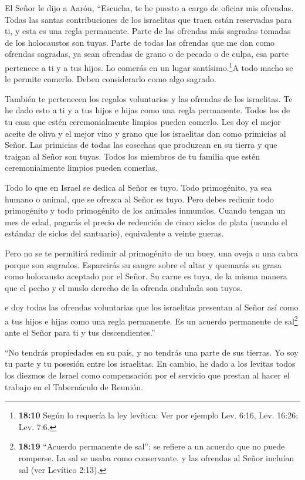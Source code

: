  El Señor le dijo a Aarón, ``Escucha, te he puesto a cargo
de oficiar mis ofrendas. Todas las santas contribuciones de los
israelitas que traen están reservadas para ti, y esta es una regla
permanente.  Parte de las ofrendas más sagradas tomadas de
los holocaustos son tuyas. Parte de todas las ofrendas que me dan como
ofrendas sagradas, ya sean ofrendas de grano o de pecado o de culpa, esa
parte pertenece a ti y a tus hijos.  Lo comerás en un lugar
santísimo.\footnote{\textbf{18:10} Según lo requería la ley levítica:
  Ver por ejemplo Lev. 6:16, Lev. 16:26; Lev. 7:6.}A todo macho se le
permite comerlo. Deben considerarlo como algo sagrado.

 También te pertenecen los regalos voluntarios y las
ofrendas de los israelitas. Te he dado esto a ti y a tus hijos e hijas
como una regla permanente. Todos los de tu casa que estén
ceremonialmente limpios pueden comerlo.  Les doy el mejor
aceite de oliva y el mejor vino y grano que los israelitas dan como
primicias al Señor.  Las primicias de todas las cosechas
que produzcan en su tierra y que traigan al Señor son tuyas. Todos los
miembros de tu familia que estén ceremonialmente limpios pueden
comerlas.

 Todo lo que en Israel se dedica al Señor es tuyo.
 Todo primogénito, ya sea humano o animal, que se ofrezca
al Señor es tuyo. Pero debes redimir todo primogénito y todo primogénito
de los animales inmundos.  Cuando tengan un mes de edad,
pagarás el precio de redención de cinco siclos de plata (usando el
estándar de siclos del santuario), equivalente a veinte gueras.

 Pero no se te permitirá redimir al primogénito de un buey,
una oveja o una cabra porque son sagrados. Esparcirás su sangre sobre el
altar y quemarás su grasa como holocausto aceptado por el Señor.
 Su carne es tuya, de la misma manera que el pecho y el
muslo derecho de la ofrenda ondulada son tuyos.

 e doy todas las ofrendas voluntarias que los israelitas
presentan al Señor así como a tus hijos e hijas como una regla
permanente. Es un acuerdo permanente de sal\footnote{\textbf{18:19}
  ``Acuerdo permanente de sal'': se refiere a un acuerdo que no puede
  romperse. La sal se usaba como conservante, y las ofrendas al Señor
  incluían sal (ver Levítico 2:13).} ante el Señor para ti y tus
descendientes.''

 ``No tendrás propiedades en su país, y no tendrás una
parte de sus tierras. Yo soy tu parte y tu posesión entre los
israelitas.  En cambio, he dado a los levitas todos los
diezmos de Israel como compensación por el servicio que prestan al hacer
el trabajo en el Tabernáculo de Reunión.

